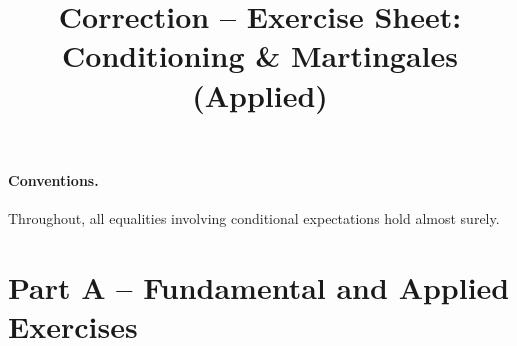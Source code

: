 \documentclass[11pt]{article}
\title{Correction -- Exercise Sheet: Conditioning \& Martingales (Applied)}
\author{}
\date{}
\begin{document}
\maketitle

\paragraph{Conventions.} Throughout, all equalities involving conditional expectations hold almost surely.

\section*{Part A -- Fundamental and Applied Exercises}
\end{document}
